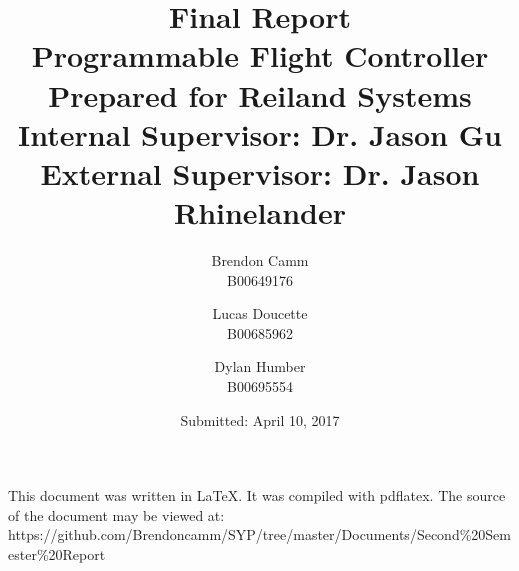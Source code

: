 \documentclass[12pt,letterpaper,titlepage]{article}
\title{Final Report \\ Programmable Flight Controller \\ Prepared for Reiland Systems \\ Internal Supervisor: Dr. Jason Gu \\ External Supervisor: Dr. Jason Rhinelander}
\author{Brendon Camm \\ B00649176 \and Lucas Doucette \\ B00685962 \and Dylan Humber \\ B00695554}
\date{Submitted: April 10, 2017}
\begin{document}
	\maketitle
	\newpage
	\vspace*{2in}
	
	This document was written in \LaTeX.  It was compiled with pdflatex.  The source of the document may be viewed at: \newline\small	https://github.com/Brendoncamm/SYP/tree/master/Documents/Second\%20Semester\%20Report
	\vspace*{4in}
	\pagebreak
	
	
	
	\setcounter{tocdepth}{2}
	\setcounter{tocdepth}{3}
	\tableofcontents
	\pagebreak
	
\end{document}
